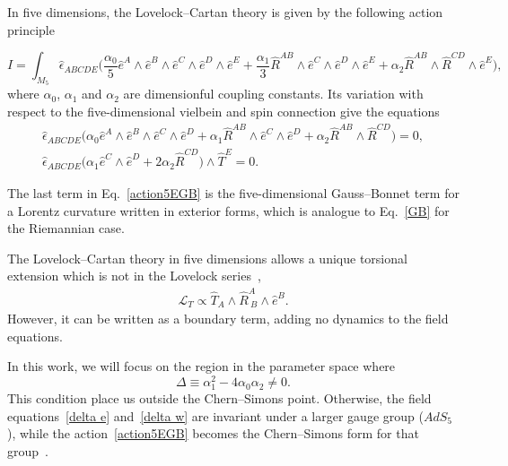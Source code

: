 \documentclass[aps,prd,12pt,superscriptaddress,showpacs,showkeys,longbibliography,reprint,nofootinbib]{revtex4-1}
\begin{document}
In five dimensions, the Lovelock--Cartan theory is given by the following action principle 
\begin{widetext}
  \begin{equation}
    \label{action5EGB}
    I = \int_{M_5} \hat{\epsilon}_{ABCDE} \Big(\frac{\alpha_0}{5}\hat{e}^A\wedge\hat{e}^B\wedge\hat{e}^C\wedge
    \hat{e}^D\wedge\hat{e}^E
    +\frac{\alpha_1}{3}\hat{R}^{AB}\wedge\hat{e}^C\wedge\hat{e}^D\wedge\hat{e}^E
    +\alpha_2\hat{R}^{AB}\wedge\hat{R}^{CD}
    \wedge\hat{e}^E\Big),
  \end{equation}
  where $\alpha_0$, $\alpha_1$ and $\alpha_2$ are dimensionful coupling constants. Its variation with respect to the five-dimensional vielbein and spin connection give the equations
  \begin{gather}
    \label{delta e}
    \hat{\epsilon}_{ABCDE}\Big(\alpha_0\hat{e}^A\wedge\hat{e}^B\wedge\hat{e}^C\wedge\hat{e}^D
    + \alpha_1\hat{R}^{AB}\wedge\hat{e}^C\wedge\hat{e}^D
    + \alpha_2\hat{R}^{AB}\wedge\hat{R}^{CD}\Big)=0,
    \\
    \label{delta w}
    \hat{\epsilon}_{ABCDE}\Big(\alpha_1\hat{e}^C\wedge\hat{e}^D+
    2\alpha_2\hat{R}^{CD}\Big)\wedge\hat{T}^E=0.
  \end{gather}
\end{widetext}

The last term in Eq.~\eqref{action5EGB} is the five-dimensional Gauss--Bonnet term for a Lorentz curvature written in exterior forms, which is analogue to Eq.~\eqref{GB} for the Riemannian case.

The Lovelock--Cartan theory in five dimensions allows a unique torsional extension which is not in the Lovelock series~\cite{Mardones:1990qc},
\begin{align}
  \label{boundary}
  \mathcal{L}_{T} \propto \hat{T}_A\wedge \hat{R}^A_{\ B}\wedge\hat{e}^B.
\end{align}
However, it can be written as a boundary term, adding no dynamics to the field equations.

In this work, we will focus on the region in the parameter space where
\begin{equation}
  \label{delta}
  \Delta\equiv\alpha_1^2-4\alpha_0\alpha_2\neq 0.
\end{equation}
This condition place us outside the Chern--Simons point. Otherwise, the field equations~\eqref{delta e} and~\eqref{delta w} are invariant under a larger gauge group ($AdS_5$), while the action~\eqref{action5EGB} becomes the Chern--Simons form for that group~\cite{Zanelli:2005sa,*Troncoso:1999pk}. 
\end{document}

